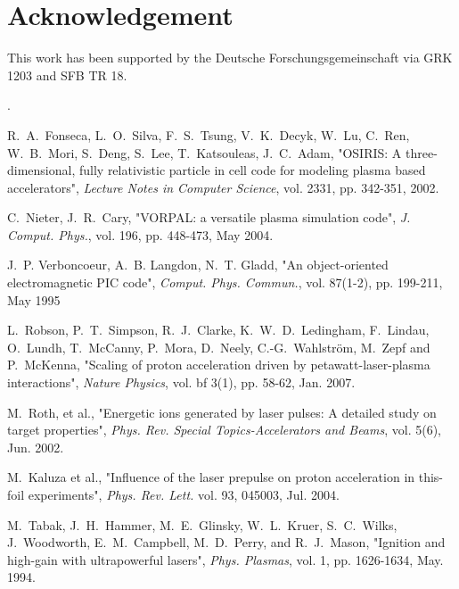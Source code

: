 \documentclass[conference]{IEEEtran}
\renewcommand{\~}{\widetilde }
\begin{document}
\section*{Acknowledgement}
This work has been supported by the Deutsche Forschungsgemeinschaft
via GRK 1203 and SFB TR 18.

\begin{thebibliography}{}



.

 R.~A.~Fonseca, L.~O.~Silva, F.~S.~Tsung, V.~K.~Decyk,
W.~Lu, C.~Ren, W.~B.~Mori, S.~Deng, S.~Lee, T.~Katsouleas, J.~C.~Adam,
"OSIRIS: A three-dimensional, fully relativistic particle in cell
code for modeling plasma based accelerators", {\em Lecture Notes in
Computer Science}, vol. 2331, pp. 342-351, 2002.

 C.~Nieter, J.~R.~Cary, "VORPAL: a versatile plasma simulation code", {\em J. Comput. Phys.}, vol. 196, pp. 448-473, May 2004.

 J.~P. Verboncoeur, A.~B. Langdon, N.~T. Gladd, "An object-oriented electromagnetic PIC code", {\em Comput. Phys. Commun.}, vol. 87(1-2), pp. 199-211,
May 1995

 L.~Robson, P.~T.~Simpson, R.~J.~Clarke,
K.~W.~D.~Ledingham, F.~Lindau, O.~Lundh, T.~McCanny, P.~Mora,
D.~Neely, C.-G.~Wahlstr\"om, M.~Zepf and P.~McKenna, "Scaling of proton acceleration driven by petawatt-laser-plasma interactions",
{\em Nature Physics}, vol. bf 3(1), pp. 58-62, Jan. 2007.

M.~Roth, et al., "Energetic ions generated by laser pulses: A detailed study on target properties",
{\em Phys. Rev. Special Topics-Accelerators and Beams}, vol. 5(6), Jun. 2002.

M.~Kaluza et al., "Influence of the laser prepulse on proton acceleration in this-foil experiments", {\em Phys. Rev. Lett.} vol. 93, 045003, Jul. 2004.

 M.~Tabak, J.~H.~Hammer, M.~E.~Glinsky, W.~L.~Kruer,
S.~C.~Wilks, J.~Woodworth, E.~M.~Campbell, M.~D.~Perry, and
R.~J.~Mason, "Ignition and high-gain with ultrapowerful lasers", {\em Phys. Plasmas}, vol. 1, pp. 1626-1634, May. 1994.


\end{thebibliography}
\end{document}
